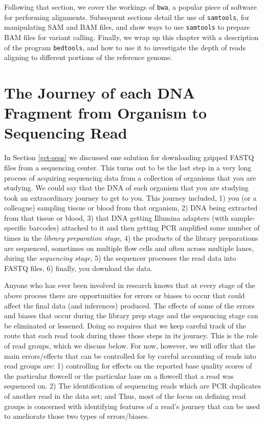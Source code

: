\documentclass[]{krantz}
\begin{document}
Following that section, we cover the workings of \texttt{bwa}, a popular piece of software
for performing alignments. Subsequent sections detail the use of \texttt{samtools}, for
manipulating SAM and BAM files, and show ways to use \texttt{samtools} to prepare
BAM files for variant calling. Finally, we wrap up this chapter with
a description of the program \texttt{bedtools}, and how to use it to investigate the
depth of reads aligning to different portions of the reference genome.

\hypertarget{the-journey-of-each-dna-fragment-from-organism-to-sequencing-read}{%
\section{The Journey of each DNA Fragment from Organism to Sequencing Read}\label{the-journey-of-each-dna-fragment-from-organism-to-sequencing-read}}

In Section \ref{get-seqs} we discussed one solution for downloading gzipped FASTQ
files from a sequencing center. This turns out to be the last step in a very long
process of acquiring sequencing data from a collection of organisms that you
are studying. We could say that the DNA of each organism that you are studying
took an extraordinary journey to get to you. This journey included, 1) you (or a
colleague) sampling tissue or blood from that organism, 2) DNA being extracted from
that tissue or blood, 3) that DNA getting Illumina adapters (with sample-specific
barcodes) attached to it and then getting
PCR amplified some number of times in the \emph{library preparation stage}, 4) the
products of the library preparations are sequenced, sometimes on multiple flow
cells and often across multiple lanes, during the \emph{sequencing stage}, 5) the
sequencer processes the read data into FASTQ files, 6) finally, you download the
data.

Anyone who has ever been involved in research knows that at every stage
of the above process there are opportunities for errors or biases to occur
that could affect the final data (and inferences) produced. The effects of some
of the errors and biases that occur during the library prep stage and the
sequencing stage can be eliminated or lessened. Doing so requires that
we keep careful track of the route that each read took during those
those steps in its journey. This is the role of read groups, which
we discuss below.
For now, however, we will offer that the main errors/effects that can
be controlled for by careful accounting of reads into read groups are:
1) controlling for effects on the reported
base quality scores of the particular flowcell
or the particular lane on a flowcell that a read was sequenced on.
2) The identification of sequencing reads which are PCR duplicates of another
read in the data set; and Thus,
most of the focus on defining read groups is concerned with identifying
features of a read's journey that can be used to ameliorate those two
types of errors/biases.
\end{document}
